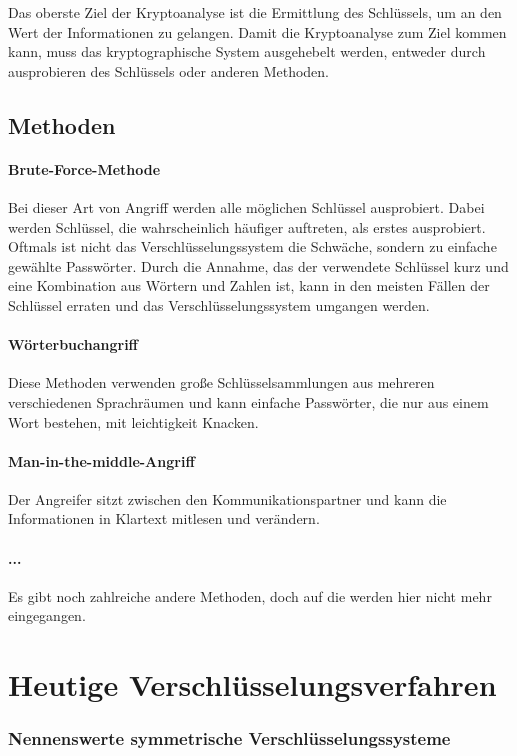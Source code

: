 \documentclass[12pt,a4paper]{report}
\begin{document}
\begin{onehalfspace}
Das oberste Ziel der Kryptoanalyse ist die Ermittlung des Schlüssels, um an den Wert der Informationen zu gelangen. Damit die Kryptoanalyse zum Ziel kommen kann, muss das kryptographische System ausgehebelt werden, entweder durch ausprobieren des Schlüssels oder anderen Methoden.

\subsection{Methoden}

\paragraph{Brute-Force-Methode} Bei dieser Art von Angriff werden alle möglichen Schlüssel ausprobiert. Dabei werden Schlüssel, die wahrscheinlich häufiger auftreten, als erstes ausprobiert. Oftmals ist nicht das Verschlüsselungssystem die Schwäche, sondern zu einfache gewählte Passwörter. Durch die Annahme, das der verwendete Schlüssel kurz und eine Kombination aus Wörtern und Zahlen ist, kann in den meisten Fällen der Schlüssel erraten und das Verschlüsselungssystem umgangen werden.

\paragraph{Wörterbuchangriff} Diese Methoden verwenden große Schlüsselsammlungen aus mehreren verschiedenen Sprachräumen und kann einfache Passwörter, die nur aus einem Wort bestehen, mit leichtigkeit Knacken.

\paragraph{Man-in-the-middle-Angriff} Der Angreifer sitzt zwischen den Kommunikationspartner und kann die Informationen in Klartext mitlesen und verändern.

\paragraph{...} Es gibt noch zahlreiche andere Methoden, doch auf die werden hier nicht mehr eingegangen. 

\section{Heutige Verschlüsselungsverfahren}

\subsubsection{Nennenswerte symmetrische Verschlüsselungssysteme}


\end{onehalfspace}
\end{document}

